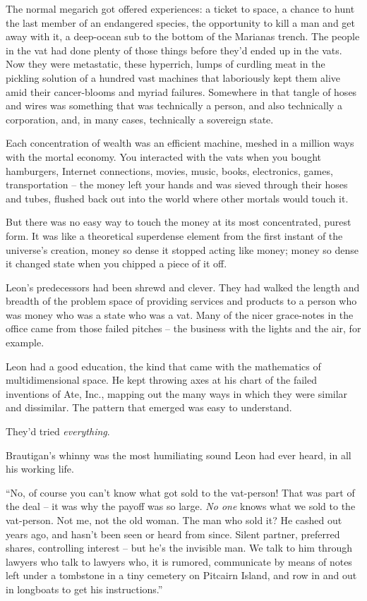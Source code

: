 The normal megarich got offered experiences: a ticket to space, a 
chance to hunt the last member of an endangered species, the 
opportunity to kill a man and get away with it, a deep-ocean sub to the 
bottom of the Marianas trench. The people in the vat had done plenty of 
those things before they'd ended up in the vats. Now they were 
metastatic, these hyperrich, lumps of curdling meat in the pickling 
solution of a hundred vast machines that laboriously kept them alive 
amid their cancer-blooms and myriad failures. Somewhere in that tangle 
of hoses and wires was something that was technically a person, and 
also technically a corporation, and, in many cases, technically a 
sovereign state.

Each concentration of wealth was an efficient machine, meshed in a 
million ways with the mortal economy. You interacted with the vats when 
you bought hamburgers, Internet connections, movies, music, books, 
electronics, games, transportation -- the money left your hands and was 
sieved through their hoses and tubes, flushed back out into the world 
where other mortals would touch it.

But there was no easy way to touch the money at its most concentrated, 
purest form. It was like a theoretical superdense element from the 
first instant of the universe's creation, money so dense it stopped 
acting like money; money so dense it changed state when you chipped a 
piece of it off.

Leon's predecessors had been shrewd and clever. They had walked the 
length and breadth of the problem space of providing services and 
products to a person who was money who was a state who was a vat. Many 
of the nicer grace-notes in the office came from those failed pitches 
-- the business with the lights and the air, for example.

Leon had a good education, the kind that came with the mathematics of 
multidimensional space. He kept throwing axes at his chart of the 
failed inventions of Ate, Inc., mapping out the many ways in which they 
were similar and dissimilar. The pattern that emerged was easy to 
understand.

They'd tried \emph{everything}.

\tb

Brautigan's whinny was the most humiliating sound Leon had ever heard, 
in all his working life.

“No, of course you can't know what got sold to the vat-person! That 
was part of the deal -- it was why the payoff was so large. \emph{No 
one} knows what we sold to the vat-person. Not me, not the old woman. 
The man who sold it? He cashed out years ago, and hasn't been seen or 
heard from since. Silent partner, preferred shares, controlling 
interest -- but he's the invisible man. We talk to him through lawyers 
who talk to lawyers who, it is rumored, communicate by means of notes 
left under a tombstone in a tiny cemetery on Pitcairn Island, and row 
in and out in longboats to get his instructions.”

